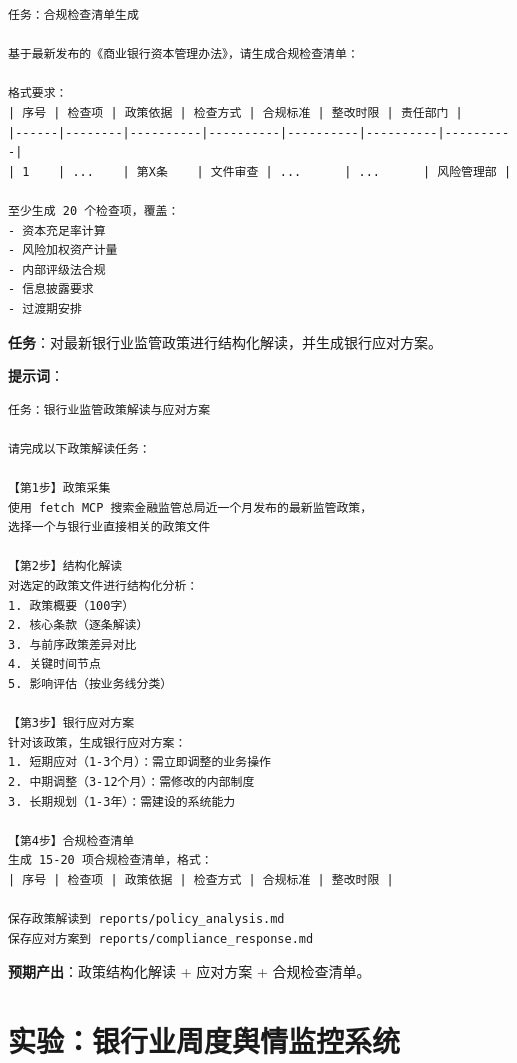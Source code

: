\begin{lstlisting}
任务：合规检查清单生成

基于最新发布的《商业银行资本管理办法》，请生成合规检查清单：

格式要求：
| 序号 | 检查项 | 政策依据 | 检查方式 | 合规标准 | 整改时限 | 责任部门 |
|------|--------|----------|----------|----------|----------|----------|
| 1    | ...    | 第X条    | 文件审查 | ...      | ...      | 风险管理部 |

至少生成 20 个检查项，覆盖：
- 资本充足率计算
- 风险加权资产计量
- 内部评级法合规
- 信息披露要求
- 过渡期安排
\end{lstlisting}

\begin{practicebox}[实操：用AI解读最新监管政策]
\textbf{任务}：对最新银行业监管政策进行结构化解读，并生成银行应对方案。

\textbf{提示词}：

\begin{lstlisting}
任务：银行业监管政策解读与应对方案

请完成以下政策解读任务：

【第1步】政策采集
使用 fetch MCP 搜索金融监管总局近一个月发布的最新监管政策，
选择一个与银行业直接相关的政策文件

【第2步】结构化解读
对选定的政策文件进行结构化分析：
1. 政策概要（100字）
2. 核心条款（逐条解读）
3. 与前序政策差异对比
4. 关键时间节点
5. 影响评估（按业务线分类）

【第3步】银行应对方案
针对该政策，生成银行应对方案：
1. 短期应对（1-3个月）：需立即调整的业务操作
2. 中期调整（3-12个月）：需修改的内部制度
3. 长期规划（1-3年）：需建设的系统能力

【第4步】合规检查清单
生成 15-20 项合规检查清单，格式：
| 序号 | 检查项 | 政策依据 | 检查方式 | 合规标准 | 整改时限 |

保存政策解读到 reports/policy_analysis.md
保存应对方案到 reports/compliance_response.md
\end{lstlisting}

\textbf{预期产出}：政策结构化解读 + 应对方案 + 合规检查清单。
\end{practicebox}

\section{实验：银行业周度舆情监控系统}

